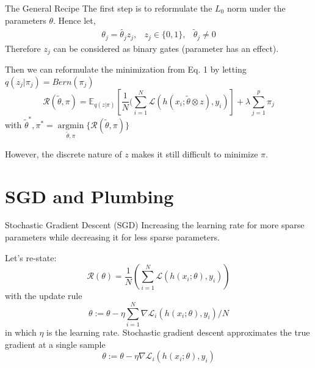 \documentclass{beamer}
\DeclareMathOperator*{\argmin}{argmin}
\begin{document}
\begin{frame}[t]{The General Recipe}
  The first step is to reformulate the $L_0$ norm under the parameters $\theta$.
  Hence let,
  \begin{equation}
    \begin{matrix}
      \theta_j = \tilde{\theta_j}z_j, & z_j \in \{0, 1\}, & \tilde{\theta}_j \neq 0
    \end{matrix}
  \end{equation}
  Therefore $z_j$ can be considered as binary gates (parameter has an effect).

  Then we can reformulate the minimization from Eq. 1 by letting $q(z_j|\pi_j) = Bern(\pi_j)$
  \begin{equation}
    \mathcal{R}(\tilde{\theta}, \pi) = \mathbb{E}_{q(z|\pi)} [\frac{1}{N} ( \sum^N_{i=1} \mathcal{L}(h(x_i; \tilde{\theta} \otimes z), y_i)] + \lambda \sum^{p}_{j=1} \pi_j
  \end{equation}
  with  $\tilde{\theta}^*, \pi^* = \underset{{\tilde{\theta}, \pi}}{\argmin} \{\mathcal{R}(\tilde{\theta}, \pi)\}$

  However, the discrete nature of $z$ makes it still difficult to minimize $\pi$.
\end{frame}

\section{SGD and Plumbing}

\begin{frame}[t]{Stochastic Gradient Descent (SGD)}
  Increasing the learning rate for more sparse parameters while decreasing it for less sparse parameters.

  Let's re-state:
  \begin{equation} 
    \mathcal{R}(\theta) = \frac{1}{N} ( \sum^N_{i=1} \mathcal{L}(h(x_i; \theta), y_i))
  \end{equation}
  with the update rule
  \begin{equation}
    \theta := \theta - \eta \sum^N_{i=1} \nabla\mathcal{L}_i(h(x_i; \theta), y_i)/N
  \end{equation}
  in which $\eta$ is the learning rate.
  Stochastic gradient descent approximates the true gradient at a single sample
  \begin{equation}
    \theta := \theta - \eta \nabla\mathcal{L}_i(h(x_i; \theta), y_i)
  \end{equation}
\end{frame}
\end{document}
